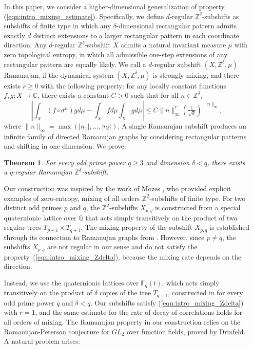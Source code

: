 \documentclass[12pt]{article}
\newtheorem{theorem}{Theorem}
\theoremstyle{definition}
\begin{document}
In this paper, we consider a higher-dimensional generalization of property (\ref{eqn:intro_mixing_estimate}). Specifically, we define $d$-regular $\mathbb{Z}^{\delta}$-subshifts as subshifts of finite type in which any
$\delta$-dimensional rectangular pattern admits exactly $d$ distinct extensions to a larger rectangular pattern in each coordinate direction. Any $d$-regular $\mathbb{Z}^\delta$-subshift $X$ admits a natural invariant measure $\mu$ with zero topological entropy, in which all admissible one-step extensions of any rectangular pattern are equally likely. We call a $d$-regular subshift $(X,\mathbb{Z}^\delta,\mu)$ Ramanujan, if the dynamical system $(X,\mathbb{Z}^\delta,\mu)$ is strongly mixing, and there exists $r\geq 0$ with the following property: for any locally constant functions $f,g:X\rightarrow\mathbb{C}$, there exists a constant $C>0$ such that for all $n\in\mathbb{Z}^\delta$,
\begin{equation}\label{eqn:intro_mixing_Zdelta}
\left|\int_X (f\circ \sigma^n)gd\mu - \int_Xfd\mu\int_Xgd\mu\right|\leq C\|n\|_\infty^{r}\left(\tfrac{1}{\sqrt{d}}\right)^{\|n\|_\infty},
\end{equation}
where $\|n\|_\infty=\max(|n_1|,\ldots,|n_\delta|)$. A single Ramanujan subshift produces an infinite family of directed Ramanujan graphs by considering rectangular patterns and shifting in one dimension.
We prove:

\begin{theorem}
For every odd prime power $q\geq 3$ and dimension $\delta<q$, there exists a $q$-regular Ramanujan $\mathbb{Z}^\delta$-subshift.
\end{theorem}

Our construction was inspired by the work of Mozes \cite{Mozes1992}, who provided explicit examples of zero-entropy, mixing of all orders $\mathbb{Z}^2$-subshifts of finite type. For two distinct odd primes $p$ and $q$, the $\mathbb{Z}^2$-subshifts $X_{p,q}$ is constructed from a special quaternionic lattice over $\mathbb{Q}$ that acts simply transitively on the product of two regular trees $T_{p+1}\times T_{q+1}$. The mixing property of the subshift $X_{p,q}$ is established through its connection to Ramanujan graphs from \cite{RamanujanGraphs1988}.
However, since $p\neq q$, the subshifts $X_{p,q}$ are not regular in our sense and do not satisfy the property~(\ref{eqn:intro_mixing_Zdelta}), because the mixing rate depends on the direction.

Instead, we use the quaternionic lattices over $\mathbb{F}_q(t)$, which acts simply transitively on the product of $\delta$ copies of the tree $T_{q+1}$, constructed in \cite{StixVdovina2017,RSV2019} for every odd prime power $q$ and $\delta<q$. Our subshifts satisfy (\ref{eqn:intro_mixing_Zdelta}) with $r=1$, and the same estimate for the rate of decay of correlations holds for all orders of mixing. The Ramanujan property in our construction relies on the Ramanujan-Peterson conjecture for $GL_2$ over function fields, proved by Drinfeld. A natural problem arises:
\end{document}
